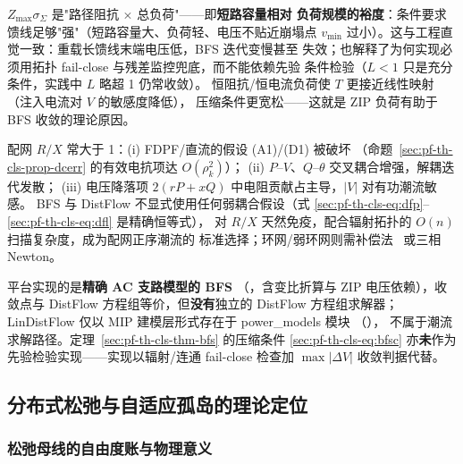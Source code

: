 \begin{remark}\label{sec:pf-th-cls-rem-bfsc}
$Z_{\max}\sigma_\Sigma$ 是"路径阻抗 $\times$ 总负荷"——即\textbf{短路容量相对
负荷规模的裕度}：条件要求馈线足够"强"（短路容量大、负荷轻、电压不贴近崩塌点
$v_{\min}$ 过小）。这与工程直觉一致：重载长馈线末端电压低，BFS 迭代变慢甚至
失效；也解释了为何实现必须用拓扑 fail-close 与残差监控兜底，而不能依赖先验
条件检验（$L<1$ 只是充分条件，实践中 $L$ 略超 1 仍常收敛）。
恒阻抗/恒电流负荷使 $T$ 更接近线性映射（注入电流对 $V$ 的敏感度降低），
压缩条件更宽松——这就是 ZIP 负荷有助于 BFS 收敛的理论原因。
\end{remark}

\begin{remark}[高 $R/X$ 弱网特性与方法选择]\label{sec:pf-th-cls-rem-rx}
配网 $R/X$ 常大于 1：(i) FDPF/直流的假设 (A1)/(D1) 被破坏
（命题~\ref{sec:pf-th-cls-prop-dcerr} 的有效电抗项达 $O(\rho_k^2)$）；
(ii) $P$--$V$、$Q$--$\theta$ 交叉耦合增强，解耦迭代发散；
(iii) 电压降落项 $2(rP+xQ)$ 中电阻贡献占主导，$|V|$ 对有功潮流敏感。
BFS 与 DistFlow 不显式使用任何弱耦合假设（式
\eqref{sec:pf-th-cls-eq:dfp}--\eqref{sec:pf-th-cls-eq:dfl} 是精确恒等式），
对 $R/X$ 天然免疫，配合辐射拓扑的 $O(n)$ 扫描复杂度，成为配网正序潮流的
标准选择；环网/弱环网则需补偿法~\cite{cls:shirmohammadi} 或三相 Newton。
\end{remark}

\begin{gapnote}
平台实现的是\textbf{精确 AC 支路模型的 BFS}
（，含变比折算与 ZIP 电压依赖），收敛点与
DistFlow 方程组等价，但\textbf{没有}独立的 DistFlow 方程组求解器；
LinDistFlow 仅以 MIP 建模层形式存在于 power\_models 模块
（），
不属于潮流求解路径。定理~\ref{sec:pf-th-cls-thm-bfs} 的压缩条件
\eqref{sec:pf-th-cls-eq:bfsc} 亦\textbf{未}作为先验检验实现——实现以辐射/连通
fail-close 检查加 $\max|\Delta V|$ 收敛判据代替。
\end{gapnote}

\subsection{分布式松弛与自适应孤岛的理论定位}\label{sec:pf-th-cls-slack}

\subsubsection{松弛母线的自由度账与物理意义}


